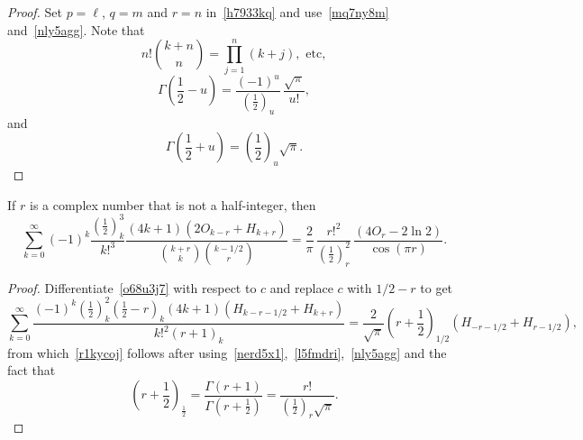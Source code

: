 \documentclass[12pt,reqno]{article}
\begin{document}
\begin{proof}
Set $p=\ell$, $q=m$ and $r=n$ in~\eqref{h7933kq} and use~\eqref{mq7ny8m} and~\eqref{nly5agg}. Note that
\begin{equation}
n!\binom{{k + n}}{n} = \prod_{j = 1}^n {\left( {k + j} \right)},\text{ etc} ,
\end{equation}
\begin{equation}
\Gamma \left( {\frac{1}{2} - u} \right) = \frac{{( - 1)^u }}{{\left( {\frac{1}{2}} \right)_u }}\,\frac{{\sqrt \pi  }}{{u!}},
\end{equation}
and
\begin{equation}
\Gamma \left( {\frac{1}{2} + u} \right) = \left( {\frac{1}{2}} \right)_u \sqrt \pi .
\end{equation}
\end{proof}
\begin{theorem}
If $r$ is a complex number that is not a half-integer, then
\begin{equation}\label{r1kycoj}
\sum_{k = 0}^\infty  {( - 1)^k \frac{{\left( {\frac{1}{2}} \right)_k^3 }}{{k!^3 }}\frac{{\left( {4k + 1} \right)\left( {2O_{k - r}  + H_{k + r} } \right)}}{{\binom{{k + r}}{k}\binom{{k - 1/2}}{r}}}}  = \frac{2}{\pi }\,\frac{{r!^2 }}{{\left( {\frac{1}{2}} \right)_r^2 }}\,\frac{{\left( {4O_r  - 2\ln 2} \right)}}{{\cos \left( \pi r \right)}}.
\end{equation}
\end{theorem}
\begin{proof}
Differentiate~\eqref{o68u3j7} with respect to $c$ and replace $c$ with $1/2-r$ to get
\begin{equation}\label{hr8o23s}
\sum_{k = 0}^\infty  {\frac{{( - 1)^k \left( {\frac{1}{2}} \right)_k^2 \left( {\frac{1}{2} - r} \right)_k \left( {4k + 1} \right)\left( {H_{k - r - 1/2}  + H_{k + r} } \right)}}{{k!^2 \left( {r + 1} \right)_k }}}  = \frac{2}{{\sqrt \pi  }}\left( {r + \frac{1}{2}} \right)_{1/2} \left( {H_{ - r - 1/2}  + H_{r - 1/2} } \right),
\end{equation}
from which~\eqref{r1kycoj} follows after using~\eqref{nerd5x1},~\eqref{l5fmdri},~\eqref{nly5agg} and the fact that
\begin{equation}\label{g20r5hg}
\left( {r + \frac{1}{2}} \right)_{\frac{1}{2}}  = \frac{{\Gamma \left( {r + 1} \right)}}{{\Gamma \left( {r + \frac{1}{2}} \right)}} = \frac{{r!}}{{\left( {\frac{1}{2}} \right)_r \sqrt \pi  }}.
\end{equation}
\end{proof}
\end{document}
